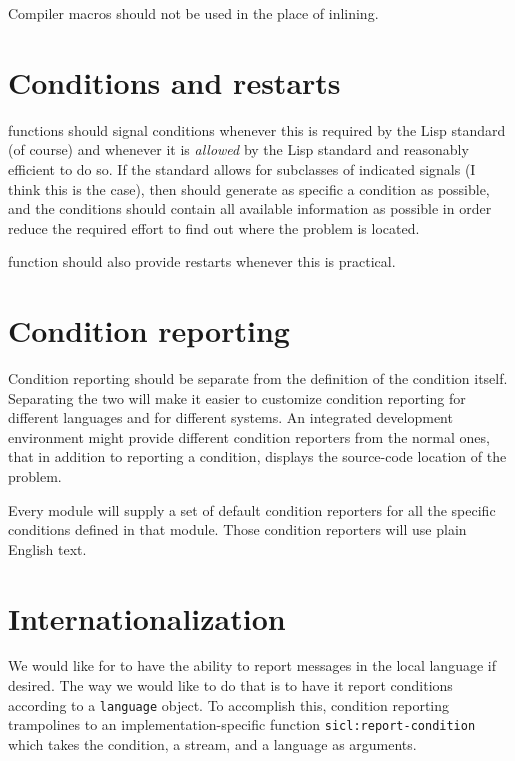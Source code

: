 Compiler macros should not be used in the place of inlining.

\section{Conditions and restarts}

\sysname{} functions should signal conditions whenever this is
required by the Lisp standard (of course) and whenever it is
\emph{allowed} by the Lisp standard and reasonably efficient to do so.
If the standard allows for subclasses of indicated signals (I think
this is the case), then \sysname{} should generate as specific a
condition as possible, and the conditions should contain all available
information as possible in order reduce the required effort to
find out where the problem is located.

\sysname{} function should also provide restarts whenever this is
practical. 

\section{Condition reporting}

Condition reporting should be separate from the definition of the
condition itself.  Separating the two will make it easier to customize
condition reporting for different languages and for different
systems.  An integrated development environment might provide
different condition reporters from the normal ones, that in addition
to reporting a condition, displays the source-code location of the
problem. 

Every \sysname{} module will supply a set of default condition
reporters for all the specific conditions defined in that module.
Those condition reporters will use plain English text. 

\section{Internationalization}

We would like for {\sysname} to have the ability to report messages in
the local language if desired.  The way we would like to do that is to
have it report conditions according to a \texttt{language} object.  To
accomplish this, condition reporting trampolines to an
implementation-specific function \texttt{sicl:report-condition} which
takes the condition, a stream, and a language as arguments.

